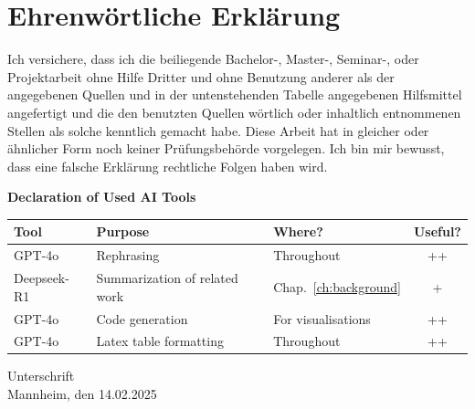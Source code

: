 \documentclass[a4paper,oneside,bibliography=totoc]{scrbook}
\begin{document}
\backmatter
\chapter{Ehrenwörtliche Erklärung}

Ich versichere, dass ich die beiliegende Bachelor-, Master-, Seminar-, oder
Projektarbeit ohne Hilfe Dritter und ohne Benutzung anderer als der angegebenen
Quellen und in der untenstehenden Tabelle angegebenen Hilfsmittel angefertigt
und die den benutzten Quellen wörtlich oder inhaltlich entnommenen Stellen als
solche kenntlich gemacht habe. Diese Arbeit hat in gleicher oder ähnlicher Form
noch keiner Prüfungsbehörde vorgelegen. Ich bin mir bewusst, dass eine falsche
Erklärung rechtliche Folgen haben wird.

\begin{center}
  \textbf{Declaration of Used AI Tools} \\[.3em]
  \begin{tabularx}{\textwidth}{lXlc}
    \toprule
    Tool & Purpose & Where? & Useful? \\
    \midrule
    GPT-4o & Rephrasing & Throughout & ++ \\
    Deepseek-R1 & Summarization of related work & Chap.~\ref{ch:background} & + \\
    GPT-4o & Code generation & For visualisations & ++ \\
    GPT-4o & Latex table formatting & Throughout & ++ \\
    \bottomrule
  \end{tabularx}
\end{center}

\vspace{2cm}
\noindent Unterschrift\\
\noindent Mannheim, den 14.02.2025 \hfill
\end{document}

